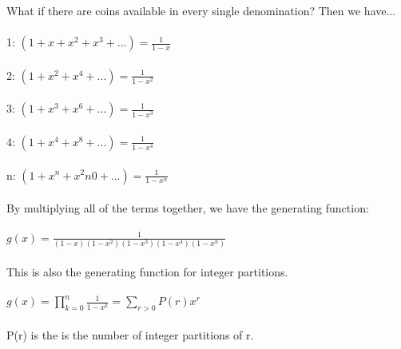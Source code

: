 \documentclass[11pt,twosided]{article}
\begin{document}
\begin{solution}
What if there are coins available in every single denomination?
Then we have... \\\\
1\textcent{}: $(1+x+x^2+x^3+...)=\frac{1}{1-x}$ \\\\
2\textcent{}: $(1+x^2+x^4+...)=\frac{1}{1-x^2}$\\\\
3\textcent{}: $(1+x^3+x^6+...)=\frac{1}{1-x^3}$\\\\
4\textcent{}: $(1+x^4+x^8+...)=\frac{1}{1-x^4}$\\\\
n\textcent{}: $(1+x^n+x^2n0+...)=\frac{1}{1-x^n}$\\\\
By multiplying all of the terms together, we have the generating function: \\\\
$g(x)=\frac{1}{(1-x)(1-x^2)(1-x^3)(1-x^4)(1-x^n)}$ \\\\
This is also the generating function for integer partitions. \\\\
$g(x) = \prod_{k=0}^n \frac{1}{1-x^k} = \sum_{r>0} P(r)x^r $ \\\\
P(r) is the is the number of integer partitions of r.
\end{solution}

\\
\end{document}
